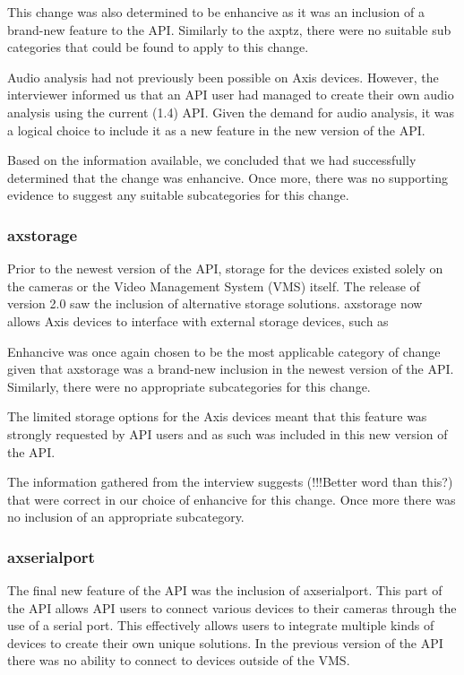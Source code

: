 \documentclass{sig-alternate}
\begin{document}
This change was also determined to be enhancive as it was an inclusion of a brand-new feature to the API. Similarly to the axptz, there were no suitable sub categories that could be found to apply to this change.

Audio analysis had not previously been possible on Axis devices. However, the interviewer informed us that an API user had managed to create their own audio analysis using the current (1.4) API. Given the demand for audio analysis, it was a logical choice to include it as a new feature in the new version of the API.

Based on the information available, we concluded that we had successfully determined that the change was enhancive. Once more, there was no supporting evidence to suggest any suitable subcategories for this change.

\subsubsection{axstorage}

Prior to the newest version of the API, storage for the devices existed solely on the cameras or the Video Management System (VMS) itself. The release of version 2.0 saw the inclusion of alternative storage solutions. axstorage now allows Axis devices to interface with external storage devices, such as     

Enhancive was once again chosen to be the most applicable category of change given that axstorage was a brand-new inclusion in the newest version of the API. Similarly, there were no appropriate subcategories for this change.

The limited storage options for the Axis devices meant that this feature was strongly requested by API users and as such was included in this new version of the API.

The information gathered from the interview suggests (!!!Better word than this?) that were correct in our choice of enhancive for this change. Once more there was no inclusion of an appropriate subcategory.

\subsubsection{axserialport}

The final new feature of the API was the inclusion of axserialport. This part of the API allows API users to connect various devices to their cameras through the use of a serial port. This effectively allows users to integrate multiple kinds of devices to create their own unique solutions. In the previous version of the API there was no ability to connect to devices outside of the VMS.
\end{document}
